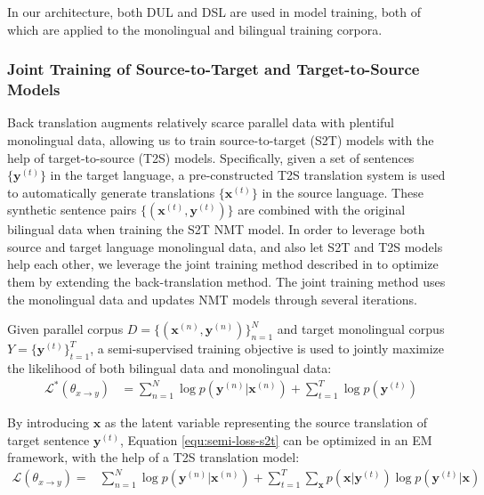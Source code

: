 \documentclass[a4paper]{article}
\begin{document}
\begin{CJK*}{UTF8}{gbsn}
In our architecture, both DUL and DSL are used in model training, both of which are applied to the monolingual and bilingual training corpora.

\subsubsection{Joint Training of Source-to-Target and Target-to-Source Models}
\label{sec-s2t-t2s}

Back translation \cite{sennrich2015improving} augments relatively scarce parallel data with plentiful monolingual data, allowing us to train source-to-target (S2T) models with the help of target-to-source (T2S) models.  
Specifically, given a set of sentences $\{\mathbf{y}^{(t)}\}$ in the target language, a pre-constructed T2S translation system is used to automatically generate translations $\{\mathbf{x}^{(t)}\}$ in the source language. These synthetic sentence pairs $\{(\mathbf{x}^{(t)}, \mathbf{y}^{(t)})\}$ are combined with the original bilingual data when training the S2T NMT model.
In order to leverage both source and target language monolingual data, and also let S2T and T2S models help each other,
we leverage the joint training method described in \cite{Joint_S2T_T2S} to optimize them by extending the back-translation method. The joint training method uses the  monolingual data and updates NMT models through several iterations.

Given parallel corpus $D=\{(\mathbf{x}^{(n)},\mathbf{y}^{(n)})\}_{n=1}^{N}$ and target monolingual corpus  $Y = \{\mathbf{y}^{(t)}\}_{t=1}^{T}$, a semi-supervised training objective is used to jointly maximize the likelihood of both bilingual data and monolingual data:
\begin{equation}
\begin{aligned}
\mathcal{L}^*(\theta_{x\rightarrow y}) &= \sum_{n=1}^N \log p(\mathbf{y}^{(n)}|\mathbf{x}^{(n)}) + \sum_{t=1}^T\log p(\mathbf{y}^{(t)})
\end{aligned}
\label{equ:semi-loss-s2t}
\end{equation}

By introducing $\mathbf{x}$ as the latent variable representing the source translation of target sentence $\mathbf{y}^{(t)}$, Equation \ref{equ:semi-loss-s2t} can be optimized in an EM framework, with the help of a T2S translation model:
\begin{equation}
\begin{aligned}
\mathcal{L}(\theta_{x\rightarrow y}) = & \sum_{n=1}^N \log p(\mathbf{y}^{(n)}|\mathbf{x}^{(n)})  + \sum_{t=1}^T\sum_{\mathbf{x}} p(\mathbf{x}|\mathbf{y}^{(t)}) \log p(\mathbf{y}^{(t)}|\mathbf{x}) 
\end{aligned}
\label{equ:semi-loss-opt1}
\end{equation}


\end{CJK*}
\end{document}
